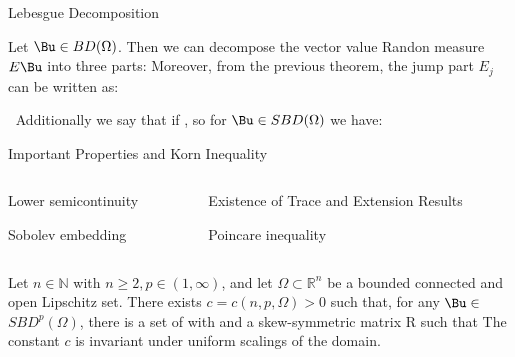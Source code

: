 \documentclass{beamer}
\newcommand{\bul}{{\color{structure}\textbullet}}
\begin{document}
\begin{frame}{Lebesgue Decomposition}
    \begin{definition} Let $\Bu \in B D(\Omega)$. Then we can decompose the vector value Randon measure $E\Bu$ into three parts:
        \pause
        Moreover, from the previous theorem, the jump part $E_j$ can be written as:
        \end{definition}
\pause\vfill
\bul $\ $ Additionally we say that  if , so for $\Bu\in SBD(\Omega)$ we have:
\end{frame}
\begin{frame}{Important Properties and Korn Inequality}
    \begin{itemize}
        \hspace{1cm}
        \begin{columns}
            \begin{column}{0.3\textwidth}  %
                \item[\bul] Lower semicontinuity
                 \vfill
                \item[\bul] Sobolev embedding
            \end{column}
            \begin{column}{0.65\textwidth}
                \item[\bul] Existence of Trace and Extension Results
                \vfill
                \item[\bul] Poincare inequality
            \end{column}
        \end{columns}
    \end{itemize}
    \vfill\pause
    \begin{theorem}\label{KornBDGeneralDomain}
        Let $n \in \mathbb{N}$ with $n \geq 2, p \in(1, \infty)$, and let $\Omega \subset \mathbb{R}^n$ be a bounded connected and open Lipschitz set. There exists $c=c(n, p, \Omega)>0$ such that, for any $\Bu \in$ $ S B D^p(\Omega)$, there is a set of  with  and a skew-symmetric matrix R such that
        The constant $c$ is invariant under uniform scalings of the domain.
    \end{theorem}
\end{frame}
\end{document}
